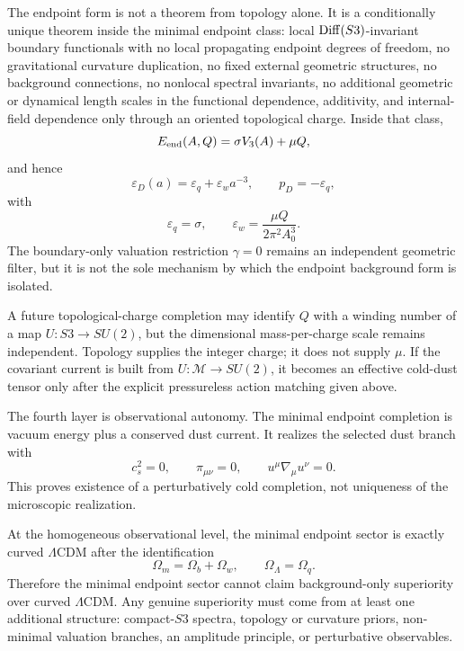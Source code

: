 \documentclass[11pt,a4paper]{article}
\def\Sthree{S3}%
\numberwithin{equation}{section}
\theoremstyle{remark}
\newcommand{\Sthree}{S^3}
\newcommand{\M}{\mathcal{M}}
\newcommand{\epsD}{\varepsilon_D}
\newcommand{\pD}{p_D}
\begin{document}
The endpoint form is not a theorem from topology alone. It is a conditionally unique theorem inside the minimal endpoint class: local \({\rm Diff}(\Sthree)\)-invariant boundary functionals with no local propagating endpoint degrees of freedom, no gravitational curvature duplication, no fixed external geometric structures, no background connections, no nonlocal spectral invariants, no additional geometric or dynamical length scales in the functional dependence, additivity, and internal-field dependence only through an oriented topological charge. Inside that class,
\begin{equation}
E_{\rm end}(A,Q)=\sigma V_3(A)+\mu Q,
\end{equation}
and hence
\begin{equation}
\epsD(a)=\varepsilon_q+\varepsilon_w a^{-3},
\qquad
\pD=-\varepsilon_q,
\end{equation}
with
\begin{equation}
\varepsilon_q=\sigma,
\qquad
\varepsilon_w=\frac{\mu Q}{2\pi^2A_0^3}.
\end{equation}
The boundary-only valuation restriction \(\gamma=0\) remains an independent geometric filter, but it is not the sole mechanism by which the endpoint background form is isolated.

A future topological-charge completion may identify \(Q\) with a winding number of a map \(U:\Sthree\to SU(2)\), but the dimensional mass-per-charge scale remains independent. Topology supplies the integer charge; it does not supply \(\mu\). If the covariant current is built from \(U:\M\to SU(2)\), it becomes an effective cold-dust tensor only after the explicit pressureless action matching given above.

The fourth layer is observational autonomy. The minimal endpoint completion is vacuum energy plus a conserved dust current. It realizes the selected dust branch with
\begin{equation}
c_s^2=0,
\qquad
\pi_{\mu\nu}=0,
\qquad
u^\mu\nabla_\mu u^\nu=0.
\end{equation}
This proves existence of a perturbatively cold completion, not uniqueness of the microscopic realization.

At the homogeneous observational level, the minimal endpoint sector is exactly curved \(\Lambda\)CDM after the identification
\begin{equation}
\Omega_m=\Omega_b+\Omega_w,
\qquad
\Omega_\Lambda=\Omega_q.
\end{equation}
Therefore the minimal endpoint sector cannot claim background-only superiority over curved \(\Lambda\)CDM. Any genuine superiority must come from at least one additional structure: compact-\(\Sthree\) spectra, topology or curvature priors, non-minimal valuation branches, an amplitude principle, or perturbative observables.
\end{document}

